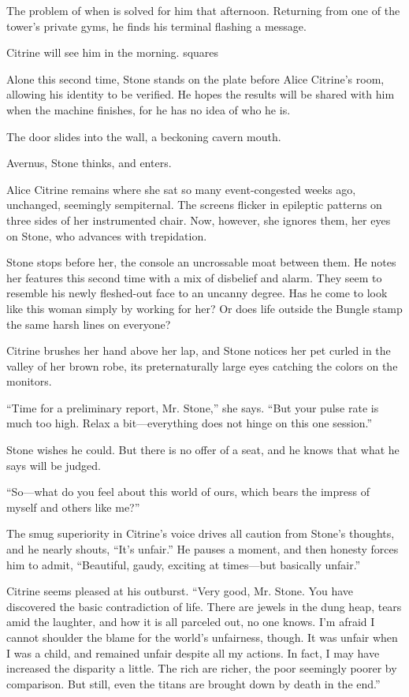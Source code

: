 The problem of when is solved for him that afternoon. Returning from one of the tower’s private gyms, he finds his terminal flashing a message.

Citrine will see him in the morning.
squares

Alone this second time, Stone stands on the plate before Alice Citrine’s room, allowing his identity to be verified. He hopes the results will be shared with him when the machine finishes, for he has no idea of who he is.

The door slides into the wall, a beckoning cavern mouth.

Avernus, Stone thinks, and enters.

Alice Citrine remains where she sat so many event-congested weeks ago, unchanged, seemingly sempiternal. The screens flicker in epileptic patterns on three sides of her instrumented chair. Now, however, she ignores them, her eyes on Stone, who advances with trepidation.

Stone stops before her, the console an uncrossable moat between them. He notes her features this second time with a mix of disbelief and alarm. They seem to resemble his newly fleshed-out face to an uncanny degree. Has he come to look like this woman simply by working for her? Or does life outside the Bungle stamp the same harsh lines on everyone?

Citrine brushes her hand above her lap, and Stone notices her pet curled in the valley of her brown robe, its preternaturally large eyes catching the colors on the monitors.

“Time for a preliminary report, Mr. Stone,” she says. “But your pulse rate is much too high. Relax a bit—everything does not hinge on this one session.”

Stone wishes he could. But there is no offer of a seat, and he knows that what he says will be judged.

“So—what do you feel about this world of ours, which bears the impress of myself and others like me?”

The smug superiority in Citrine’s voice drives all caution from Stone’s thoughts, and he nearly shouts, “It’s unfair.” He pauses a moment, and then honesty forces him to admit, “Beautiful, gaudy, exciting at times—but basically unfair.”

Citrine seems pleased at his outburst. “Very good, Mr. Stone. You have discovered the basic contradiction of life. There are jewels in the dung heap, tears amid the laughter, and how it is all parceled out, no one knows. I’m afraid I cannot shoulder the blame for the world’s unfairness, though. It was unfair when I was a child, and remained unfair despite all my actions. In fact, I may have increased the disparity a little. The rich are richer, the poor seemingly poorer by comparison. But still, even the titans are brought down by death in the end.”


